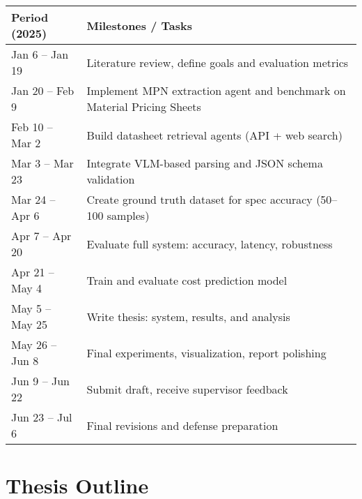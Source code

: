 \documentclass[11pt]{article}
\begin{document}
\begin{tabular}{ll}
\textbf{Period (2025)} & \textbf{Milestones / Tasks} \\
\hline
Jan 6 – Jan 19     & Literature review, define goals and evaluation metrics \\
Jan 20 – Feb 9     & Implement MPN extraction agent and benchmark on Material Pricing Sheets \\
Feb 10 – Mar 2     & Build datasheet retrieval agents (API + web search) \\
Mar 3 – Mar 23     & Integrate VLM-based parsing and JSON schema validation \\
Mar 24 – Apr 6     & Create ground truth dataset for spec accuracy (50–100 samples) \\
Apr 7 – Apr 20     & Evaluate full system: accuracy, latency, robustness \\
Apr 21 – May 4     & Train and evaluate cost prediction model \\
May 5 – May 25     & Write thesis: system, results, and analysis \\
May 26 – Jun 8     & Final experiments, visualization, report polishing \\
Jun 9 – Jun 22     & Submit draft, receive supervisor feedback \\
Jun 23 – Jul 6     & Final revisions and defense preparation \\
\end{tabular}


\section*{Thesis Outline}
\end{document}
